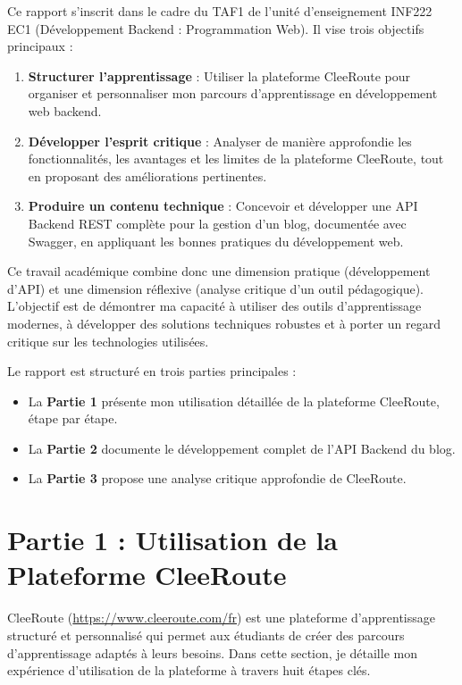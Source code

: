 \documentclass[12pt,a4paper]{article}
\begin{document}
Ce rapport s'inscrit dans le cadre du TAF1 de l'unité d'enseignement INF222 EC1 (Développement Backend : Programmation Web). Il vise trois objectifs principaux :

\begin{enumerate}
    \item \textbf{Structurer l'apprentissage} : Utiliser la plateforme CleeRoute pour organiser et personnaliser mon parcours d'apprentissage en développement web backend.

    \item \textbf{Développer l'esprit critique} : Analyser de manière approfondie les fonctionnalités, les avantages et les limites de la plateforme CleeRoute, tout en proposant des améliorations pertinentes.

    \item \textbf{Produire un contenu technique} : Concevoir et développer une API Backend REST complète pour la gestion d'un blog, documentée avec Swagger, en appliquant les bonnes pratiques du développement web.
\end{enumerate}

Ce travail académique combine donc une dimension pratique (développement d'API) et une dimension réflexive (analyse critique d'un outil pédagogique). L'objectif est de démontrer ma capacité à utiliser des outils d'apprentissage modernes, à développer des solutions techniques robustes et à porter un regard critique sur les technologies utilisées.

Le rapport est structuré en trois parties principales :
\begin{itemize}
    \item La \textbf{Partie 1} présente mon utilisation détaillée de la plateforme CleeRoute, étape par étape.
    \item La \textbf{Partie 2} documente le développement complet de l'API Backend du blog.
    \item La \textbf{Partie 3} propose une analyse critique approfondie de CleeRoute.
\end{itemize}

\newpage

\section{Partie 1 : Utilisation de la Plateforme CleeRoute}

CleeRoute (\url{https://www.cleeroute.com/fr}) est une plateforme d'apprentissage structuré et personnalisé qui permet aux étudiants de créer des parcours d'apprentissage adaptés à leurs besoins. Dans cette section, je détaille mon expérience d'utilisation de la plateforme à travers huit étapes clés.
\end{document}
